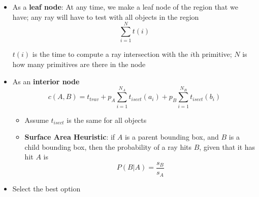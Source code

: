 \documentclass[letterpaper, 11pt]{article}
\begin{document}
      \begin{itemize}
        \item As a \textbf{leaf node}:
        At any time, we make a leaf node of the region that we have;
        any ray will have to test with all objects in the region
        \begin{equation}
          \sum_{i = 1}^{N} t\left( i \right)
        \end{equation}

        $ t\left( i \right) $ is the time to compute a ray intersection with
        the $ i $th primitive; $ N $ is how many primitives are there in the
        node

        \item As an \textbf{interior node}
        \begin{equation}
          c\left( A, B \right) = t_{trav}
            + p_{A} \sum_{i = 1}^{N_{A}} t_{isect} \left( a_{i} \right)
            + p_{B} \sum_{i = 1}^{N_{B}} t_{isect} \left( b_{i} \right)
        \end{equation}

        \begin{itemize}
          \item Assume $ t_{isect} $ is the same for all objects
          \item \textbf{Surface Area Heuristic}: if $ A $ is a parent bounding
          box, and $ B $ is a child bounding box, then the probability of
          a ray hits $ B $, given that it has hit $ A $ is
          \begin{equation}
            P\left( B | A \right) = \frac{s_{B}}{s_{A}}
          \end{equation}
        \end{itemize}

        \item Select the best option
      \end{itemize}
\end{document}
